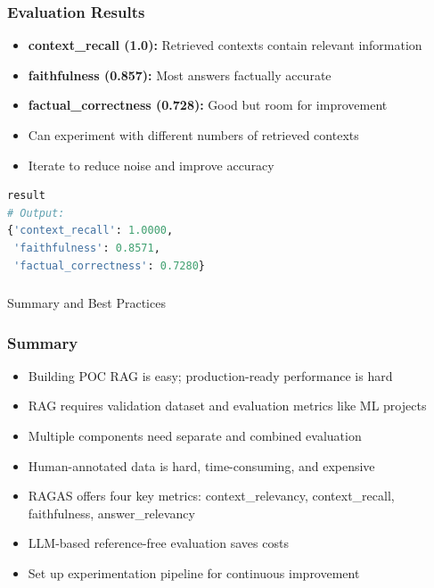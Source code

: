 \begin{frame}[fragile]\frametitle{Evaluation Results}

  \begin{itemize}
    \item \textbf{context\_recall (1.0):} Retrieved contexts contain relevant information
    \item \textbf{faithfulness (0.857):} Most answers factually accurate
    \item \textbf{factual\_correctness (0.728):} Good but room for improvement
    \item Can experiment with different numbers of retrieved contexts
    \item Iterate to reduce noise and improve accuracy
  \end{itemize}
  
\begin{lstlisting}[language=Python]
result
# Output:
{'context_recall': 1.0000, 
 'faithfulness': 0.8571, 
 'factual_correctness': 0.7280}
\end{lstlisting}


\end{frame}

\begin{frame}[fragile]\frametitle{}
\begin{center}
{\Large Summary and Best Practices}
\end{center}
\end{frame}

\begin{frame}[fragile]\frametitle{Summary}
  \begin{itemize}
    \item Building POC RAG is easy; production-ready performance is hard
    \item RAG requires validation dataset and evaluation metrics like ML projects
    \item Multiple components need separate and combined evaluation
    \item Human-annotated data is hard, time-consuming, and expensive
    \item RAGAS offers four key metrics: context\_relevancy, context\_recall, faithfulness, answer\_relevancy
    \item LLM-based reference-free evaluation saves costs
    \item Set up experimentation pipeline for continuous improvement
  \end{itemize}
\end{frame}

